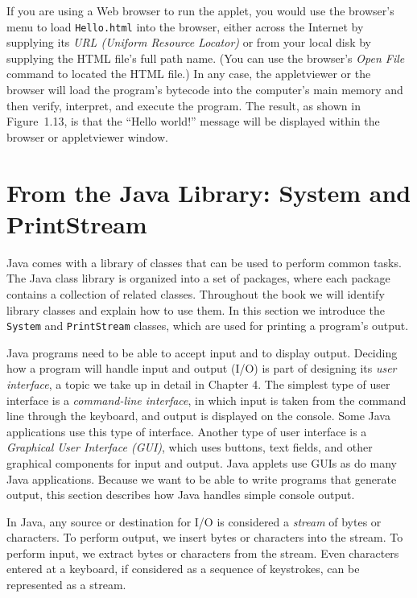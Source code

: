 \noindent If you are using a Web browser to run the 
applet, you would use the browser's menu to load {\tt Hello.html} into
the browser, either across the Internet by supplying its {\it URL
(Uniform Resource Locator)} or from your local disk by supplying the
HTML file's full path name. (You can use the browser's {\it Open File}
command to located the HTML file.)  In any case, the appletviewer or
the browser will load the program's bytecode into the computer's main
memory and then verify, interpret, and execute the program.  The
result, as shown in Figure~1.13, is that the ``Hello world!'' message
will be displayed within the browser or appletviewer window.

\vspace*{2pc}
\section{From the Java Library: System and \\PrintStream}
\label{pg-sec-systemclass}
\WWWjava 
Java comes with a library of classes that can be used to perform
common tasks. The Java class library is organized into a set
of packages, where each package contains a collection of related
classes.  Throughout the book we will identify library classes and
explain how to use them. In this section we introduce the {\tt System}
and {\tt PrintStream} classes, which are used for printing a program's
output.

Java programs need to be able to accept input and to display output.
Deciding how a program will handle input and output (I/O) is part of
designing its {\em user interface}, a topic we take up in detail in
Chapter 4. The simplest type of user interface is a {\it command-line
interface}, in which input is taken from the command line through the
keyboard, and output is displayed on the console.  Some Java
applications use this type of interface. Another type of user
interface is a {\it Graphical User Interface (GUI)}, which uses
buttons, text fields, and other graphical components for input and
output. Java applets use GUIs as do many Java applications.  Because
we want to be able to write programs that generate output, this
section describes how Java handles simple console output.

In Java, any source or destination for I/O is considered a {\it
stream} of bytes or characters. To perform output, we insert bytes or
characters into the stream. To perform input, we extract bytes or
characters from the stream.  Even characters entered at a keyboard, if
considered as a sequence of keystrokes, can be represented as a
stream.


